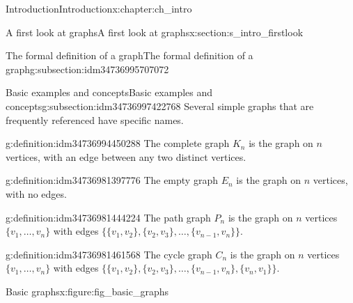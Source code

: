 \documentclass[oneside,10pt,]{book}
\numberwithin{equation}{section}
\begin{document}
\begin{chapterptx}{Introduction}{}{Introduction}{}{}{x:chapter:ch_intro}
\begin{sectionptx}{A first look at graphs}{}{A first look at graphs}{}{}{x:section:s_intro_firstlook}
\begin{subsectionptx}{The formal definition of a graph}{}{The formal definition of a graph}{}{}{g:subsection:idm34736995707072}
\end{subsectionptx}
%
%
\typeout{************************************************}
\typeout{************************************************}
%
\begin{subsectionptx}{Basic examples and concepts}{}{Basic examples and concepts}{}{}{g:subsection:idm34736997422768}
Several simple graphs that are frequently referenced have specific names.%
\begin{definition}{}{g:definition:idm34736994450288}%
The complete graph \(K_n\) is the graph on \(n\) vertices, with an edge between any two distinct vertices.%
\end{definition}
\begin{definition}{}{g:definition:idm34736981397776}%
The empty graph \(E_n\) is the graph on \(n\) vertices, with no edges.%
\end{definition}
\begin{definition}{}{g:definition:idm34736981444224}%
The path graph \(P_n\) is the graph on \(n\) vertices \(\{v_1,\dots, v_n\}\) with edges \(\{ \{v_1, v_2\}, \{v_2,v_3\},\dots,\{v_{n-1},v_n\}\}\).%
\end{definition}
\begin{definition}{}{g:definition:idm34736981461568}%
The cycle graph \(C_n\) is the graph on \(n\) vertices \(\{v_1,\dots, v_n\}\) with edges \(\{ \{v_1, v_2\}, \{v_2,v_3\},\dots,\{v_{n-1},v_n\}, \{v_n, v_1\}\}\).%
\end{definition}
\begin{figureptx}{Basic graphs}{x:figure:fig_basic_graphs}{}%
\begin{image}{0.05}{0.9}{0.05}%
\end{image}
\end{figureptx}
\end{subsectionptx}
\end{sectionptx}
\end{chapterptx}
\end{document}
